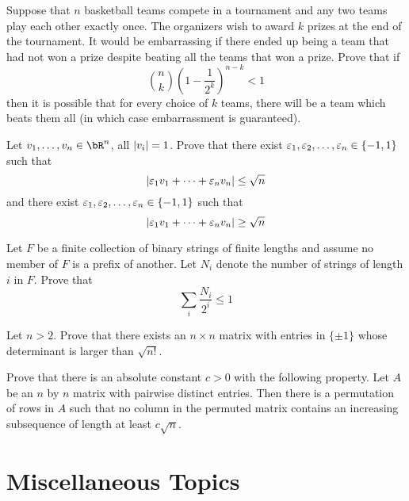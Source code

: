 \documentclass[12pt]{article}
\begin{document}
        \begin{exercise}
            Suppose that $n$ basketball teams compete in a tournament and any two teams play each other exactly once. The organizers wish to award $k$ prizes at the end of the tournament. It would be embarrassing if there ended up being a team that had not won a prize despite beating all the teams that won a prize. Prove that if
            \[\binom{n}{k}\left(1-\frac{1}{2^k}\right)^{n-k}<1\] then it is possible that for every choice of $k$ teams, there will be a team which beats them all (in which case embarrassment is guaranteed).
        \end{exercise}
            
        \begin{exercise}
            Let $v_1,\dots,v_n\in \bR^n$, all $\left\lvert v_i \right\rvert=1$. Prove that there exist $\varepsilon_1,\varepsilon_2,\dots,\varepsilon_n\in \{-1,1\}$ such that 
            \[|\varepsilon_1v_1+\cdots+\varepsilon_nv_n|\leq \sqrt{n}\]
            and there exist $\varepsilon_1,\varepsilon_2,\dots,\varepsilon_n\in \{-1,1\}$ such that
            \[|\varepsilon_1v_1+\cdots+\varepsilon_nv_n|\geq \sqrt{n}\]
        \end{exercise}
            
        \begin{exercise}
            Let $F$ be a finite collection of binary strings of finite lengths and assume no member of $F$ is a prefix of another. Let $N_i$ denote the number of strings of length $i$ in $F$. Prove that \[\sum_i \frac{N_i}{2^i}\leq 1\]
        \end{exercise}
            
        \begin{exercise}
            Let $n>2$. Prove that there exists an $n\times n$ matrix with entries in $\{\pm 1\}$ whose determinant is larger than $\sqrt{n!}$.
        \end{exercise}
            
        \begin{exercise}
            Prove that there is an absolute constant $c>0$ with the following property. Let $A$ be an $n$ by $n$ matrix with pairwise distinct entries. Then there is a permutation of rows in $A$ such that no column in the permuted matrix contains an increasing subsequence of length at least $c\sqrt{n}$.
        \end{exercise}

\section{Miscellaneous Topics}
\end{document}

